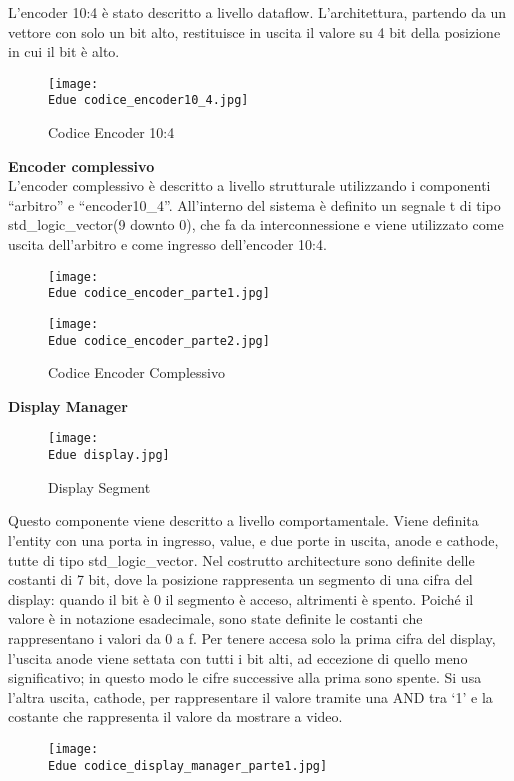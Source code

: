 \documentclass[12pt]{article}
\def \Edue {Allegati/Esercizio2/}
\begin{document}
L’encoder 10:4 è stato descritto a livello dataflow. L’architettura, partendo da un vettore con solo un bit alto, restituisce in uscita il valore su 4 bit della posizione in cui il bit è alto.
\begin{figure}[ht]
    \centering
    \texttt{[image: \\Edue codice\_encoder10\_4.jpg]}
    \caption{Codice Encoder 10:4}
\end{figure}
\newpage
{\large \textbf{Encoder complessivo}}
\\L’encoder complessivo è descritto a livello strutturale utilizzando i componenti “arbitro” e “encoder10\_4”. All’interno del sistema è definito un segnale t di tipo std\_logic\_vector(9 downto 0), che fa da interconnessione e viene utilizzato come uscita dell’arbitro e come ingresso dell’encoder 10:4.
\begin{figure}[ht]
    \centering
    \texttt{[image: \\Edue codice\_encoder\_parte1.jpg]}
\end{figure}
\begin{figure}[ht!]
    \centering
    \texttt{[image: \\Edue codice\_encoder\_parte2.jpg]}
    \caption{Codice Encoder Complessivo}
\end{figure}
\newpage
{\large \textbf{Display Manager}}
\begin{figure}[ht]
    \centering
    \texttt{[image: \\Edue display.jpg]}
    \caption{Display Segment}
\end{figure}
\newline
Questo componente viene descritto a livello comportamentale. Viene definita l’entity con una porta in ingresso, value, e due porte in uscita, anode e cathode, tutte di tipo std\_logic\_vector. Nel costrutto architecture sono definite delle costanti di 7 bit, dove la posizione rappresenta un segmento di una cifra del display: quando il bit è 0 il segmento è acceso, altrimenti è spento. Poiché il valore è in notazione esadecimale, sono state definite le costanti che rappresentano i valori da 0 a f. Per tenere accesa solo la prima cifra del display, l’uscita anode viene settata con tutti i bit alti, ad eccezione di quello meno significativo; in questo modo le cifre successive alla prima sono spente. Si usa l’altra uscita, cathode, per rappresentare il valore tramite una AND tra ‘1’ e la costante che rappresenta il valore da mostrare a video.
\begin{figure}[ht]
    \centering
    \texttt{[image: \\Edue codice\_display\_manager\_parte1.jpg]}
\end{figure}
\end{document}
